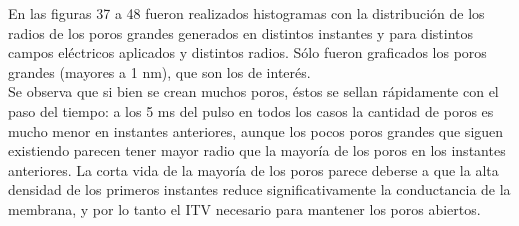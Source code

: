 \documentclass[a4paper,10pt]{article}
\begin{document}
En las figuras 37 a 48 fueron realizados histogramas con la distribución de los radios de los poros grandes generados en distintos instantes y para distintos campos eléctricos aplicados y distintos radios. Sólo fueron graficados los poros grandes (mayores a 1 $\si{\nano\metre}$), que son los de interés. \\

Se observa que si bien se crean muchos poros, éstos se sellan rápidamente con el paso del tiempo: a los 5 ms del pulso en todos los casos la cantidad de poros es mucho menor en instantes anteriores, aunque los pocos poros grandes que siguen existiendo parecen tener mayor radio que la mayoría de los poros en los instantes anteriores. La corta vida de la mayoría de los poros parece deberse a que la alta densidad de los primeros instantes reduce significativamente la conductancia de la membrana, y por lo tanto el ITV necesario para mantener los poros abiertos.


\newcommand{\imagenDobleTop}[6]{
\begin{figure}
	\makebox[\textwidth][c] {
		\centering
		\begin{minipage}[t]{.45\paperwidth}
			\centering
			\label{fig:#3}
			\texttt{[image: \#1]}
			\caption{#2}
		\end{minipage}\hfill
		\begin{minipage}[t]{.45\paperwidth}
			\centering
			\label{fig:#6}
			\texttt{[image: \#4]}
			\caption{#5}
		\end{minipage}\hfill
	}
\end{figure}
}

\newcommand{\imagenDobleBottom}[6]{
\begin{figure}
	\makebox[\textwidth][c] {
		\centering
		\begin{minipage}[b]{.45\paperwidth}
			\centering
			\label{fig:#3}
			\texttt{[image: \#1]}
			\caption{#2}
		\end{minipage}\hfill
		\begin{minipage}[b]{.45\paperwidth}
			\centering
			\label{fig:#6}
			\texttt{[image: \#4]}
			\caption{#5}
		\end{minipage}\hfill
	}
\end{figure}
}
\end{document}
